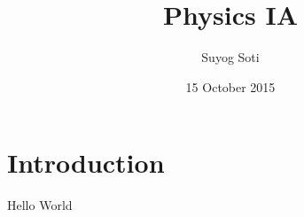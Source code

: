 \documentclass{report}
\title{Physics IA}
\author{Suyog Soti}
\date{15 October 2015}
\begin{document}
\newpage
\section*{Introduction}
Hello World
\end{document}

